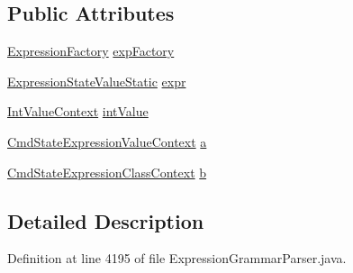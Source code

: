 \subsection*{Public Attributes}
\begin{DoxyCompactItemize}
\item 
\hyperlink{classgov_1_1nasa_1_1jpf_1_1inspector_1_1server_1_1expression_1_1_expression_factory}{Expression\+Factory} \hyperlink{classgov_1_1nasa_1_1jpf_1_1inspector_1_1server_1_1expression_1_1parser_1_1_expression_grammar_pa08e6165e66cacb4d3382a343315ee767_a1cde46ae801c9a49d578211e86952501}{exp\+Factory}
\item 
\hyperlink{classgov_1_1nasa_1_1jpf_1_1inspector_1_1server_1_1expression_1_1expressions_1_1_expression_state_value_static}{Expression\+State\+Value\+Static} \hyperlink{classgov_1_1nasa_1_1jpf_1_1inspector_1_1server_1_1expression_1_1parser_1_1_expression_grammar_pa08e6165e66cacb4d3382a343315ee767_a423359c8ac08fa40d483892c8de2c6fa}{expr}
\item 
\hyperlink{classgov_1_1nasa_1_1jpf_1_1inspector_1_1server_1_1expression_1_1parser_1_1_expression_grammar_parser_1_1_int_value_context}{Int\+Value\+Context} \hyperlink{classgov_1_1nasa_1_1jpf_1_1inspector_1_1server_1_1expression_1_1parser_1_1_expression_grammar_pa08e6165e66cacb4d3382a343315ee767_a1537250f7804b80a0c01a36cb07f2d43}{int\+Value}
\item 
\hyperlink{classgov_1_1nasa_1_1jpf_1_1inspector_1_1server_1_1expression_1_1parser_1_1_expression_grammar_pa17ff9e538e96e94398ba5af02b5ffa30}{Cmd\+State\+Expression\+Value\+Context} \hyperlink{classgov_1_1nasa_1_1jpf_1_1inspector_1_1server_1_1expression_1_1parser_1_1_expression_grammar_pa08e6165e66cacb4d3382a343315ee767_a82c3e705a920f90eb3ed154dcf1b1d3c}{a}
\item 
\hyperlink{classgov_1_1nasa_1_1jpf_1_1inspector_1_1server_1_1expression_1_1parser_1_1_expression_grammar_pa672388ef0800b4a3d173ab7548f6b406}{Cmd\+State\+Expression\+Class\+Context} \hyperlink{classgov_1_1nasa_1_1jpf_1_1inspector_1_1server_1_1expression_1_1parser_1_1_expression_grammar_pa08e6165e66cacb4d3382a343315ee767_a030e922f08cd2d353aa7cdcb3ef96a82}{b}
\end{DoxyCompactItemize}


\subsection{Detailed Description}


Definition at line 4195 of file Expression\+Grammar\+Parser.\+java.



